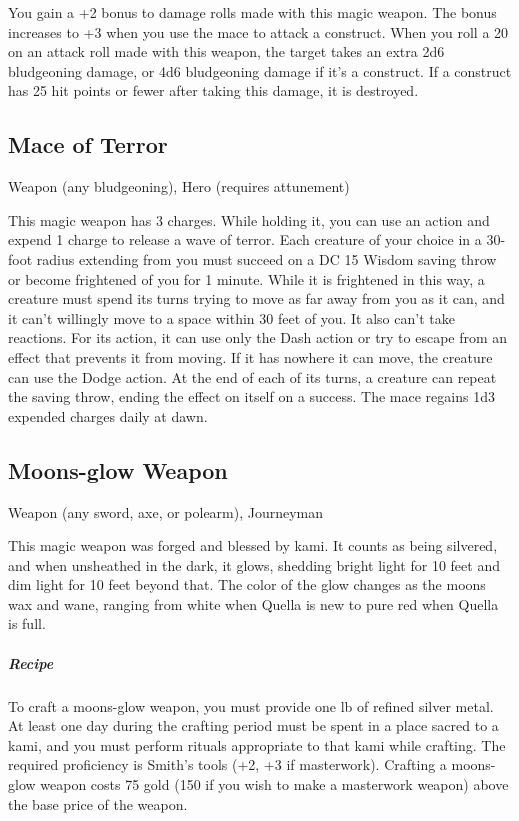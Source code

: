 You gain a +2 bonus to damage rolls made with this magic weapon. The bonus increases to +3 when you use the mace to attack a construct.  When you roll a 20 on an attack roll made with this weapon, the target takes an extra 2d6 bludgeoning damage, or 4d6 bludgeoning damage if it's a construct. If a construct has 25 hit points or fewer after taking this damage, it is destroyed.

\subsection{Mace of Terror}
Weapon (any bludgeoning), Hero (requires attunement) 

This magic weapon has 3 charges. While holding it, you can use an action and expend 1 charge to release a wave of terror. Each creature of your choice in a 30-foot radius extending from you must succeed on a DC 15 Wisdom saving throw or become frightened of you for 1 minute. While it is frightened in this way, a creature must spend its turns trying to move as far away from you as it can, and it can't willingly move to a space within 30 feet of you. It also can't take reactions. For its action, it can use only the Dash action or try to escape from an effect that prevents it from moving. If it has nowhere it can move, the creature can use the Dodge action. At the end of each of its turns, a creature can repeat the saving throw, ending the effect on itself on a success. The mace regains 1d3 expended charges daily at dawn.

\subsection{Moons-glow Weapon}
Weapon (any sword, axe, or polearm), Journeyman

This magic weapon was forged and blessed by kami. It counts as being silvered, and when unsheathed in the dark, it glows, shedding bright light for 10 feet and dim light for 10 feet beyond that. The color of the glow changes as the moons wax and wane, ranging from white when Quella is new to pure red when Quella is full.

\subparagraph*{Recipe} To craft a moons-glow weapon, you must provide one lb of refined silver metal. At least one day during the crafting period must be spent in a place sacred to a kami, and you must perform rituals appropriate to that kami while crafting. The required proficiency is Smith's tools (+2, +3 if masterwork). Crafting a moons-glow weapon costs 75 gold (150 if you wish to make a masterwork weapon) above the base price of the weapon.

